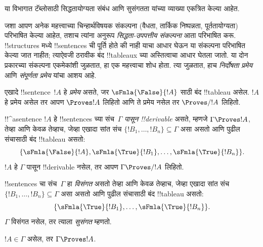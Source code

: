 \documentclass[../../../include/open-logic-section]{subfiles}
\begin{document}
      {}
      {}
      

\begin{editorial}
या विभागात टॅब्लोसाठी सिद्धतायोग्यता संबंध आणि सुसंगतता यांच्या व्याख्या
एकत्रित केल्या आहेत.
\end{editorial}

\begin{explain}
जशा आपण अनेक महत्त्वाच्या चिन्हार्थविषयक संकल्पना (वैधता, तार्किक निष्पन्नता,
पूर्ततायोग्यता) परिभाषित केल्या आहेत, तशाच त्यांना अनुरूप
\emph{सिद्धता-उपपत्तीय संकल्पना} आता परिभाषित करू. !!{structure}s मध्ये
!!{sentence}s ची पूर्ति होते की नाही याचा आधार घेऊन या संकल्पना परिभाषित
केल्या जात नाहीत; त्याऐवजी ठरावीक बंद !!{tableau}x च्या अस्तित्वाचा आधार
घेतला जातो. या दोन प्रकारच्या संकल्पना एकमेकांशी जुळतात, हा एक महत्त्वाचा
शोध होता. त्या जुळतात, हाच \emph{निर्दोषता प्रमेय} आणि
\emph{संपूर्णता प्रमेय} यांचा आशय आहे.
\end{explain}


\begin{defn}[प्रमेये]
एखादे !!{sentence}~$!A$ हे \emph{प्रमेय} असते, जर
$\sFmla{\False}{!A}$ साठी बंद !!{tableau} असेल. $!A$ हे प्रमेय असेल
तर आपण $\Proves !A$ लिहितो आणि ते प्रमेय नसेल तर $\Proves/ !A$ लिहितो.
\end{defn}

\begin{defn}[!!^{derivability}]
!!^a{sentence} $!A$ हे !!{sentence}s च्या संच~$\Gamma$ \emph{पासून
!!{derivable}} असते, म्हणजे $\Gamma \Proves !A$, तेव्हा आणि केवळ तेव्हाच,
जेव्हा एखादा सांत संच $\{!B_1, \dots, !B_n\} \subseteq \Gamma$ असा असतो
आणि पुढील संचासाठी बंद !!{tableau} असतो:
\[
\{
  \sFmla{\False}{!A},
  \sFmla{\True}{!B_1}, \dots,
  \sFmla{\True}{!B_n}
  \}.
\]
$!A$ हे $\Gamma$ पासून !!{derivable} नसेल, तर आपण $\Gamma \Proves/
!A$ लिहितो.
\end{defn}

\begin{defn}[सुसंगतता]
!!{sentence}s चा संच~$\Gamma$ हा \emph{विसंगत} असतो तेव्हा आणि केवळ तेव्हाच,
जेव्हा एखादा सांत संच $\{!B_1, \dots, !B_n\} \subseteq \Gamma$ असा असतो
आणि पुढील संचासाठी बंद !!{tableau} असतो:
\[
\{
  \sFmla{\True}{!B_1}, \dots,
  \sFmla{\True}{!B_n}  
  \}.
\]
$\Gamma$ विसंगत नसेल, तर त्याला \emph{सुसंगत} म्हणतो.
\end{defn}

\begin{prop}[परावर्तिता]
$!A \in \Gamma$ असेल, तर $\Gamma \Proves !A$.
\end{prop}
\end{document}
